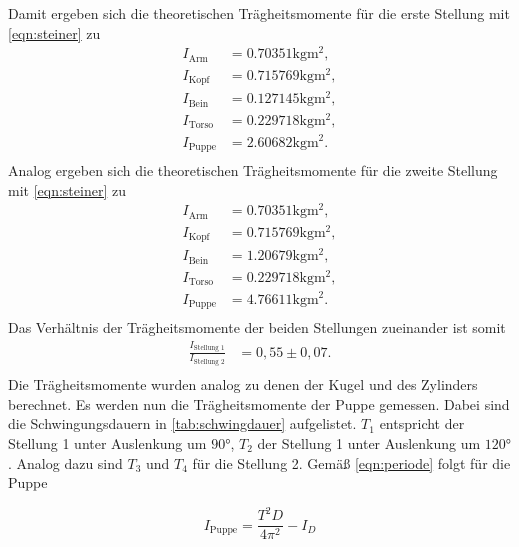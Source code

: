 Damit ergeben sich die theoretischen Trägheitsmomente für die erste Stellung  mit \autoref{eqn:steiner} zu
\begin{align*}
  I_{\text{Arm}} &= 0.70351 \si{\kilogram\meter^2}, \\
  I_{\text{Kopf}} &= 0.715769 \si{\kilogram\meter^2}, \\
  I_{\text{Bein}} &= 0.127145 \si{\kilogram\meter^2}, \\
  I_{\text{Torso}} &= 0.229718 \si{\kilogram\meter^2}, \\
  I_{\text{Puppe}} &= 2.60682 \si{\kilogram\meter^2}. \\
\end{align*}
Analog ergeben sich die theoretischen Trägheitsmomente für die zweite Stellung mit \autoref{eqn:steiner} zu
\begin{align*}
  I_{\text{Arm}} &= 0.70351 \si{\kilogram\meter^2}, \\
  I_{\text{Kopf}} &= 0.715769 \si{\kilogram\meter^2}, \\
  I_{\text{Bein}} &= 1.20679 \si{\kilogram\meter^2}, \\ 
  I_{\text{Torso}} &= 0.229718 \si{\kilogram\meter^2}, \\
  I_{\text{Puppe}} &= 4.76611 \si{\kilogram\meter^2}. \\
\end{align*}
Das Verhältnis der Trägheitsmomente der beiden Stellungen zueinander ist somit
\begin{align*}
  \frac{I_{\text{Stellung 1}}}{I_{\text{Stellung 2}}} &= 0,55\pm 0,07.  \\
\end{align*}
Die Trägheitsmomente wurden analog zu denen der Kugel und des Zylinders berechnet. 
Es werden nun die Trägheitsmomente der Puppe gemessen.
Dabei sind die Schwingungsdauern in \autoref{tab:schwingdauer} aufgelistet.
$T_1$ entspricht der Stellung 1 unter Auslenkung um $90°$, $T_2$ der Stellung 1 unter Auslenkung um $120°$.
Analog dazu sind $T_3$ und $T_4$ für die Stellung 2. Gemäß \autoref{eqn:periode} folgt für die Puppe


\begin{equation*}
  I_{\text{Puppe}} = \frac{T^2D}{4\pi^2} - I_D
\end{equation*}

